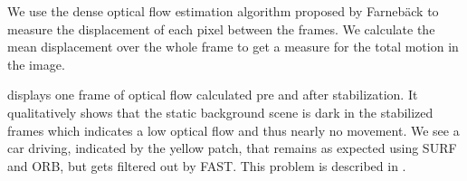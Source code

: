 We use the dense optical flow estimation algorithm proposed by Farnebäck \cite{farnback10.1007/3-540-45103-X_50,opencv_library} to measure the displacement of each pixel between the frames. 
We calculate the mean displacement over the whole frame to get a measure for the total motion in the image. 

 displays one frame of optical flow calculated pre and after stabilization.
It qualitatively shows that the static background scene is dark in the stabilized frames which indicates a low optical flow and thus nearly no movement. 
We see a car driving, indicated by the yellow patch, that remains as expected using SURF and ORB, but gets filtered out by FAST. This problem is described in .     


